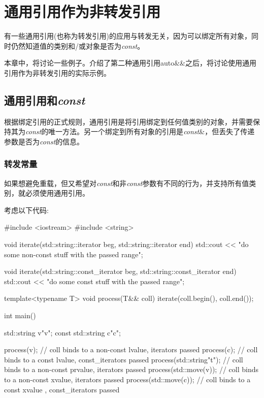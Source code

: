 \section{通用引用作为非转发引用}
有一些通用引用(也称为转发引用)的应用与转发无关，因为可以绑定所有对象，同时仍然知道值的类别和/或对象是否为\textit{const}。

本章中，将讨论一些例子。介绍了第二种通用引用auto\&\&之后，将讨论使用通用引用作为非转发引用的实际示例。

\subsection{通用引用和\textit{const}}

根据绑定引用的正式规则，通用引用是将引用绑定到任何值类别的对象，并需要保持其为\textit{const}的唯一方法。另一个绑定到所有对象的引用是\textit{const}\&，但丢失了传递参数是否为\textit{const}的信息。

\subsubsection{转发常量}

如果想避免重载，但又希望对\textit{const}和非\textit{const}参数有不同的行为，并支持所有值类别，就必须使用通用引用。

考虑以下代码:

\begin{cppcode}
#include <iostream>
#include <string>

void iterate(std::string::iterator beg, std::string::iterator end)
{
	std::cout << "do some non-const stuff with the passed range\n";
}

void iterate(std::string::const_iterator beg, std::string::const_iterator end)
{
	std::cout << "do some const stuff with the passed range\n";
}

template<typename T>
void process(T&& coll)
{
	iterate(coll.begin(), coll.end());
}

int main()
{
	std::string v{"v"};
	const std::string c{"c"};
	
	process(v); // coll binds to a non-const lvalue, iterators passed
	process(c); // coll binds to a const lvalue, const_iterators passed
	process(std::string{"t"}); // coll binds to a non-const prvalue, iterators passed
	process(std::move(v)); // coll binds to a non-const xvalue, iterators passed
	process(std::move(c)); // coll binds to a const xvalue , const_iterators passed
}
\end{cppcode}

